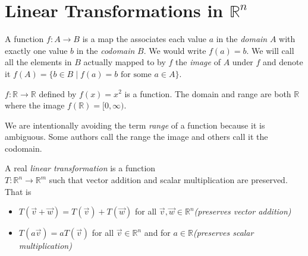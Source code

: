 \section{Linear Transformations in $\mathbb{R}^n$}

\begin{definition}[Function]
A function $f:A \to B$ is a map the associates each value $a$ in the  
\emph{domain} $A$ with exactly one value $b$ in the \emph{codomain} $B$. 
We would write $f(a)=b$. We will call all the elements in $B$ actually mapped 
to by $f$ the \emph{image} of $A$ under $f$ and denote it 
$f(A)=\{ b \in B \mid f(a)=b\text{ for some } a \in A  \}$.
\end{definition}
\begin{example}$f:\mathbb{R} \to \mathbb{R}$ defined by $f(x)=x^2$ is a function. The domain  and range are both $\mathbb{R}$ where the image $f(\mathbb{R})=[0,\infty )$.
\end{example}
\begin{remark}
We are intentionally avoiding the term \emph{range} of a function because it is ambiguous. Some authors call the range the image and others call it the codomain.
\end{remark}
\begin{definition}
A real \emph{linear transformation} is a function\\ $T: \mathbb{R}^n \to \mathbb{R}^m$ such that vector addition and scalar multiplication are preserved.
That is 
\begin{itemize}
\item $T(\vec{v}+\vec{w})=T(\vec{v})+T(\vec{w})$ for all $\vec{v},\vec{w} \in \mathbb{R}^n$\hfill \emph{(preserves vector addition)}
\item $T(a\vec{v})=aT(\vec{v})$ for all $\vec{v}\in \mathbb{R}^n$ and for $a \in \mathbb{R}$\hfill \emph{(preserves scalar multiplication)}
\end{itemize}
\end{definition}

